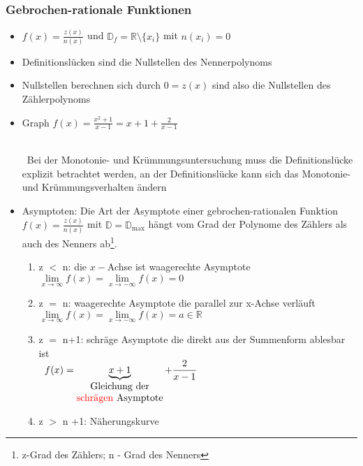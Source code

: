 \documentclass[a4paper,twocolumn,10pt]{onepgnote1}
\renewcommand\mynote{\notebox{Hinweis:}\ }
\begin{document}
\subsubsection{Gebrochen-rationale Funktionen}
\begin{itemize}
\item $f(x) = \frac{z(x)}{n(x)}$ und $\mathds{D}_f = \mathds{R}\setminus\{x_i\}$ mit $n(x_i) = 0$
\item Definitionslücken sind die Nullstellen des Nennerpolynoms
\item Nullstellen berechnen sich durch  $0= z(x)$ sind also die Nullstellen des Zählerpolynoms
\item Graph $f(x) = \frac{x^2+1}{x-1} = x+1 +\frac{2}{x-1} $\\
 \\
\mynote Bei der Monotonie- und Krümmungsuntersuchung muss die Definitionslücke explizit betrachtet werden, an der Definitionslücke kann sich das Monotonie- und Krümmungsverhalten ändern
\item Asymptoten: Die Art der Asymptote einer gebrochen-rationalen Funktion $f(x)=\frac{z(x)}{n(x)}$ mit $\mathds{D} = \mathds{D}_{\text{max}}$ hängt vom Grad der Polynome des Zählers  als auch des Nenners ab\footnote{z-Grad des Zählers; n - Grad des Nenners}.\\
\begin{enumerate}\item z $<$ n: die $x-$Achse ist waagerechte Asymptote $\lim\limits_{x\longrightarrow \infty} f(x) = \lim\limits_{x\longrightarrow -\infty} f(x) = 0$\\
\item  z $=$ n: waagerechte Asymptote die parallel zur x-Achse verläuft $\lim\limits_{x\longrightarrow \infty} f(x) = \lim\limits_{x\longrightarrow -\infty} f(x) = a \in\mathds{R}$\\
\item z $=$ n+1: schräge Asymptote die direkt aus der Summenform ablesbar ist \\
\mynote $f(x) =\underbrace{x+1}_{\shortstack{\text{Gleichung der}\\ \text{\textcolor{red}{schrägen} Asymptote}}} +\dfrac{2}{x-1}$\\
\item z $>$ n +1: Näherungskurve
\end{enumerate}
 \end{itemize}
\end{document}
